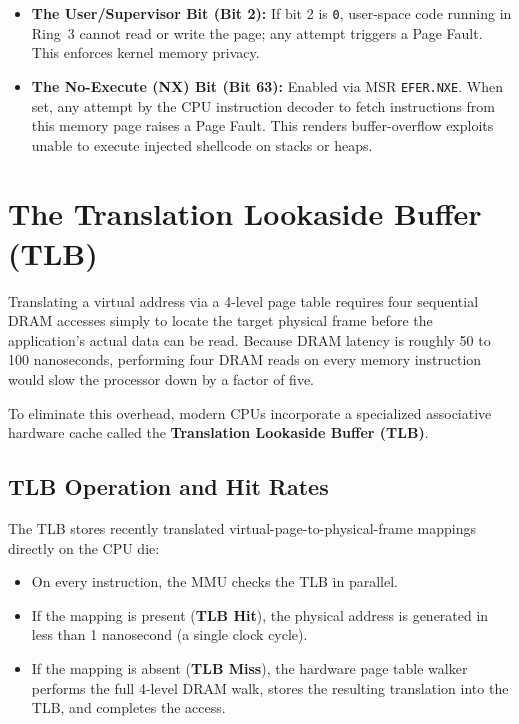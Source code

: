 \begin{itemize}
    \item \textbf{The User/Supervisor Bit (Bit 2):} If bit 2 is \texttt{0}, user-space code running in Ring~3 cannot read or write the page; any attempt triggers a Page Fault. This enforces kernel memory privacy.
    \item \textbf{The No-Execute (NX) Bit (Bit 63):} Enabled via MSR \texttt{EFER.NXE}. When set, any attempt by the CPU instruction decoder to fetch instructions from this memory page raises a Page Fault. This renders buffer-overflow exploits unable to execute injected shellcode on stacks or heaps.
\end{itemize}

\section{The Translation Lookaside Buffer (TLB)}
\label{sec:tlb_deep}

Translating a virtual address via a 4-level page table requires four sequential DRAM accesses simply to locate the target physical frame before the application's actual data can be read. Because DRAM latency is roughly 50 to 100 nanoseconds, performing four DRAM reads on every memory instruction would slow the processor down by a factor of five.

To eliminate this overhead, modern CPUs incorporate a specialized associative hardware cache called the \textbf{Translation Lookaside Buffer (TLB)}.

\subsection{TLB Operation and Hit Rates}
The TLB stores recently translated virtual-page-to-physical-frame mappings directly on the CPU die:
\begin{itemize}
    \item On every instruction, the MMU checks the TLB in parallel.
    \item If the mapping is present (\textbf{TLB Hit}), the physical address is generated in less than 1 nanosecond (a single clock cycle).
    \item If the mapping is absent (\textbf{TLB Miss}), the hardware page table walker performs the full 4-level DRAM walk, stores the resulting translation into the TLB, and completes the access.
\end{itemize}

